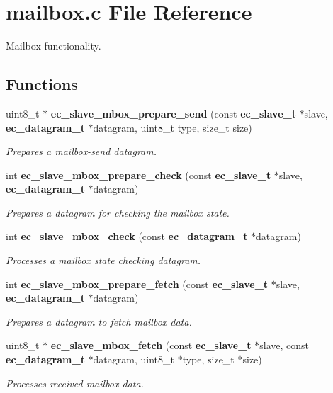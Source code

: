 \section{mailbox.\-c File Reference}
\label{mailbox_8c}


Mailbox functionality.  


\subsection*{Functions}
\begin{DoxyCompactItemize}
\item 
uint8\-\_\-t $\ast$ {\bf ec\-\_\-slave\-\_\-mbox\-\_\-prepare\-\_\-send} (const {\bf ec\-\_\-slave\-\_\-t} $\ast$slave, {\bf ec\-\_\-datagram\-\_\-t} $\ast$datagram, uint8\-\_\-t type, size\-\_\-t size)
\begin{DoxyCompactList}\small\item\em Prepares a mailbox-\/send datagram. \end{DoxyCompactList}\item 
int {\bf ec\-\_\-slave\-\_\-mbox\-\_\-prepare\-\_\-check} (const {\bf ec\-\_\-slave\-\_\-t} $\ast$slave, {\bf ec\-\_\-datagram\-\_\-t} $\ast$datagram)
\begin{DoxyCompactList}\small\item\em Prepares a datagram for checking the mailbox state. \end{DoxyCompactList}\item 
int {\bf ec\-\_\-slave\-\_\-mbox\-\_\-check} (const {\bf ec\-\_\-datagram\-\_\-t} $\ast$datagram)
\begin{DoxyCompactList}\small\item\em Processes a mailbox state checking datagram. \end{DoxyCompactList}\item 
int {\bf ec\-\_\-slave\-\_\-mbox\-\_\-prepare\-\_\-fetch} (const {\bf ec\-\_\-slave\-\_\-t} $\ast$slave, {\bf ec\-\_\-datagram\-\_\-t} $\ast$datagram)
\begin{DoxyCompactList}\small\item\em Prepares a datagram to fetch mailbox data. \end{DoxyCompactList}\item 
uint8\-\_\-t $\ast$ {\bf ec\-\_\-slave\-\_\-mbox\-\_\-fetch} (const {\bf ec\-\_\-slave\-\_\-t} $\ast$slave, const {\bf ec\-\_\-datagram\-\_\-t} $\ast$datagram, uint8\-\_\-t $\ast$type, size\-\_\-t $\ast$size)
\begin{DoxyCompactList}\small\item\em Processes received mailbox data. \end{DoxyCompactList}\end{DoxyCompactItemize}

